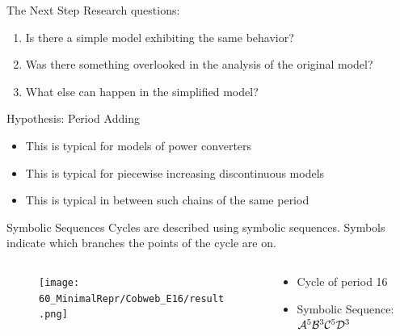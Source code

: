 \begin{frame}{The Next Step}
	\vspace{-1em}
	Research questions:
	\begin{enumerate}
		\item Is there a simple model exhibiting the same behavior? \hfill \checkmark
		\item Was there something overlooked in the analysis of the original model? \hfill \checkmark
		      \pause
		\item What else can happen in the simplified model?
	\end{enumerate}

	\pause
	\vspace{1em}
	Hypothesis: Period Adding
	\begin{itemize}
		\item This is typical for models of power converters
		\item This is typical for piecewise increasing discontinuous models
		\item This is typical in between such chains of the same period
	\end{itemize}
\end{frame}

\begin{frame}{Symbolic Sequences}
	Cycles are described using symbolic sequences.
	Symbols indicate which branches the points of the cycle are on.
	\vspace{.5em}
	\begin{columns}
		\hspace{5em}
		\begin{column}{.3 \textwidth}
			\begin{figure}
				\texttt{[image: 60\_MinimalRepr/Cobweb\_E16/result.png]}
			\end{figure}
		\end{column}
		\hspace{3em}
		\begin{column}{.6 \textwidth}
			\begin{itemize}
				\item Cycle of period 16
				\item Symbolic Sequence: $\mathcal{A}^5\mathcal{B}^3\mathcal{C}^5\mathcal{D}^3$
			\end{itemize}
		\end{column}
	\end{columns}
\end{frame}
